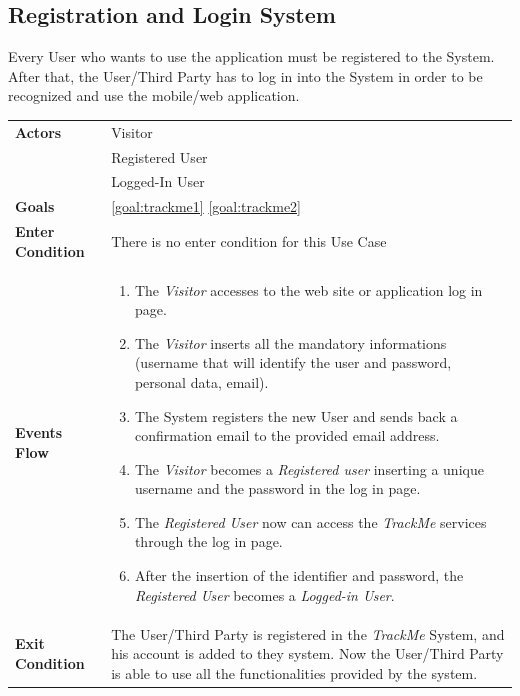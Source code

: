   \subsection{Registration and Login System}
Every User who wants to use the application must be registered to the System.
After that, the User/Third Party has to log in into the System in order to be recognized and use the mobile/web application.

\begin{table}[H]
	\centering
    
    \begin{tabular}{|p{3.5cm}|p{10.3cm}|}
    	\hline
    	\textbf{\large{Actors}} & 
		Visitor \\
    	& Registered User \\
	& Logged-In User \\
    \hline
    \textbf{\large{Goals}} 				& \ref{goal:trackme1} \ref{goal:trackme2}\\
    
    \hline
    \textbf{\large{Enter Condition}}	& There is no enter condition for this Use Case		\\
    
    \hline
    \textbf{\large{Events Flow}}		& \begin{enumerate}[leftmargin=0.5cm]
                                          	\item The \emph{Visitor}  accesses to the web site or application log in page.
                                            \item The \emph{Visitor} inserts all the mandatory informations (username that will identify the user and password, personal data, email).
                                            \item The System registers the new User and sends back a confirmation email to the provided email address.
                                            \item The \emph{Visitor} becomes a \emph{Registered user} inserting a unique username and the password in the log in page.  
                                            \item The \emph{Registered User} now can access the \emph{TrackMe} services through the log in page.
                                            \item After the insertion of the identifier and password, the \emph{Registered User} becomes a \emph{Logged-in User}.
                                          \end{enumerate}
    										\\
    \hline
    \textbf{\large{Exit Condition}} 	& The User/Third Party is registered in the \emph{TrackMe} System, and his account is added to they system. Now the User/Third Party is able to use all the functionalities provided by the system. \\
    

\end{tabular}
\end{table}
